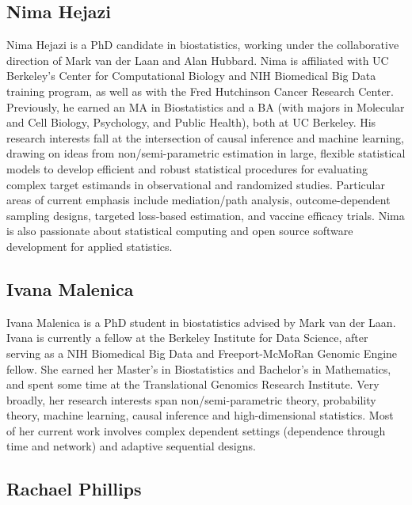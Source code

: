 \documentclass[
  12pt, krantz2,
]{book}
\theoremstyle{definition}
\theoremstyle{definition}
\theoremstyle{definition}
\newcommand{\1}{\mathbbm{1}}
\begin{document}
\hypertarget{nima-hejazi}{%
\subsection*{Nima Hejazi}\label{nima-hejazi}}


Nima Hejazi is a PhD candidate in biostatistics, working under the collaborative
direction of Mark van der Laan and Alan Hubbard. Nima is affiliated with UC
Berkeley's Center for Computational Biology and NIH Biomedical Big Data training
program, as well as with the Fred Hutchinson Cancer Research Center. Previously,
he earned an MA in Biostatistics and a BA (with majors in Molecular and Cell
Biology, Psychology, and Public Health), both at UC Berkeley. His research
interests fall at the intersection of causal inference and machine learning,
drawing on ideas from non/semi-parametric estimation in large, flexible
statistical models to develop efficient and robust statistical procedures for
evaluating complex target estimands in observational and randomized studies.
Particular areas of current emphasis include mediation/path analysis,
outcome-dependent sampling designs, targeted loss-based estimation, and vaccine
efficacy trials. Nima is also passionate about statistical computing and open
source software development for applied statistics.

\hypertarget{ivana-malenica}{%
\subsection*{Ivana Malenica}\label{ivana-malenica}}


Ivana Malenica is a PhD student in biostatistics advised by Mark van der Laan.
Ivana is currently a fellow at the Berkeley Institute for Data Science, after
serving as a NIH Biomedical Big Data and Freeport-McMoRan Genomic Engine fellow.
She earned her Master's in Biostatistics and Bachelor's in Mathematics, and
spent some time at the Translational Genomics Research Institute. Very broadly,
her research interests span non/semi-parametric theory, probability theory,
machine learning, causal inference and high-dimensional statistics. Most of her
current work involves complex dependent settings (dependence through time and
network) and adaptive sequential designs.

\hypertarget{rachael-phillips}{%
\subsection*{Rachael Phillips}\label{rachael-phillips}}
\end{document}

